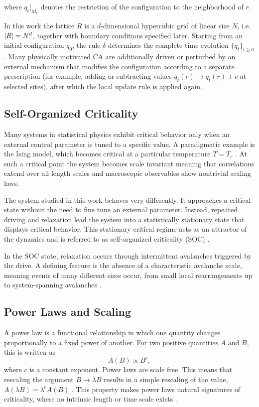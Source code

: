 where $q_t|_{M_r}$ denotes the restriction of the configuration to the neighborhood of $r$.

In this work the lattice $R$ is a $d$-dimensional hypercubic grid of linear size $N$, i.e.\ $\abs{R}=N^d$, together with boundary conditions specified later. Starting from an initial configuration $q_0$, the rule $\delta$ determines the complete time evolution $\{q_t\}_{t\ge 0}$. Many physically motivated CA are additionally driven or perturbed by an external mechanism that modifies the configuration according to a separate prescription (for example, adding or subtracting values $q_t(r)\to q_t(r)\pm c$ at selected sites), after which the local update rule is applied again.

\subsection{Self-Organized Criticality}

Many systems in statistical physics exhibit critical behavior only when an external control parameter is tuned to a specific value. A paradigmatic example is the Ising model, which becomes critical at a particular temperature $T=T_c$ \cite{stanley1971introduction}.
At such a critical point the system becomes scale invariant meaning that correlations extend over all length scales and macroscopic observables show nontrivial scaling laws.

The system studied in this work behaves very differently. It approaches a critical state without the need to fine tune an external parameter. Instead, repeated driving and relaxation lead the system into a statistically stationary state that displays critical behavior. This stationary critical regime acts as an attractor of the dynamics and is referred to as self-organized criticality (SOC) \cite{bak1987self}.

In the SOC state, relaxation occurs through intermittent avalanches triggered by the drive. A defining feature is the absence of a characteristic avalanche scale, meaning events of many different sizes occur, from small local rearrangements up to system-spanning avalanches \cite{Dhar1990}.

\subsection{Power Laws and Scaling} \label{sec:power-laws}

A power law is a functional relationship in which one quantity changes proportionally to a fixed power of another. For two positive quantities $A$ and $B$, this is written as
\begin{equation}
    A(B) \propto B^{c},
\end{equation}
where $c$ is a constant exponent. Power laws are scale free. This means that rescaling the argument $B \to \lambda B$ results in a simple rescaling of the value, $A(\lambda B)=\lambda^{c}A(B)$ \cite{Newman2005}. This property makes power laws natural signatures of criticality, where no intrinsic length or time scale exists \cite{bak1987self}.

